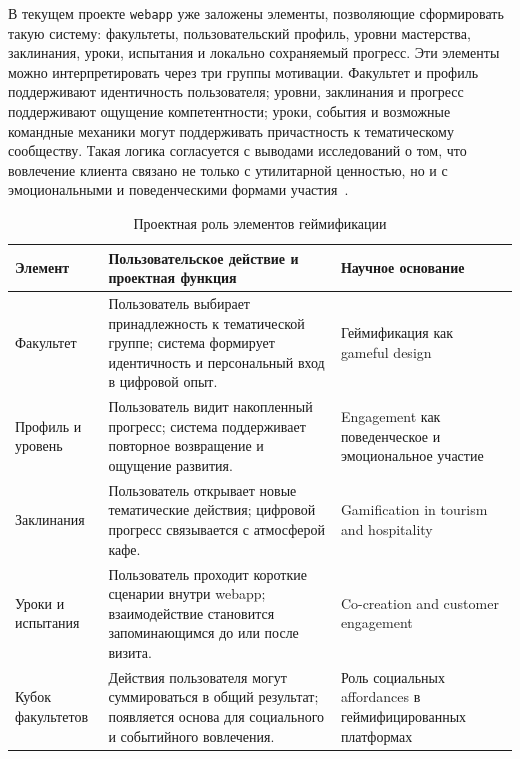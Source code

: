 В текущем проекте \texttt{webapp} уже заложены элементы, позволяющие сформировать такую систему: факультеты, пользовательский профиль, уровни мастерства, заклинания, уроки, испытания и локально сохраняемый прогресс. Эти элементы можно интерпретировать через три группы мотивации. Факультет и профиль поддерживают идентичность пользователя; уровни, заклинания и прогресс поддерживают ощущение компетентности; уроки, события и возможные командные механики могут поддерживать причастность к тематическому сообществу. Такая логика согласуется с выводами исследований о том, что вовлечение клиента связано не только с утилитарной ценностью, но и с эмоциональными и поведенческими формами участия~\cite{pansari2017,behnam2021,chathoth2016}.

\begin{table}[H]
\centering
\small
\caption{Проектная роль элементов геймификации}
\label{tab:v2_gamification_elements}
\begin{tabularx}{\textwidth}{|>{\raggedright\arraybackslash}p{}|>{\raggedright\arraybackslash}p{}|>{\raggedright\arraybackslash}X|}
\hline
\textbf{Элемент} & \textbf{Пользовательское действие и проектная функция} & \textbf{Научное основание} \\ \hline
Факультет & Пользователь выбирает принадлежность к тематической группе; система формирует идентичность и персональный вход в цифровой опыт. & Геймификация как gameful design~\cite{deterding2011} \\ \hline
Профиль и уровень & Пользователь видит накопленный прогресс; система поддерживает повторное возвращение и ощущение развития. & Engagement как поведенческое и эмоциональное участие~\cite{pansari2017,behnam2021} \\ \hline
Заклинания & Пользователь открывает новые тематические действия; цифровой прогресс связывается с атмосферой кафе. & Gamification in tourism and hospitality~\cite{xu2017,sutrisno2026} \\ \hline
Уроки и испытания & Пользователь проходит короткие сценарии внутри webapp; взаимодействие становится запоминающимся до или после визита. & Co-creation and customer engagement~\cite{chathoth2016} \\ \hline
Кубок факультетов & Действия пользователя могут суммироваться в общий результат; появляется основа для социального и событийного вовлечения. & Роль социальных affordances в геймифицированных платформах~\cite{buil2024} \\ \hline
\end{tabularx}
\normalsize
\end{table}

